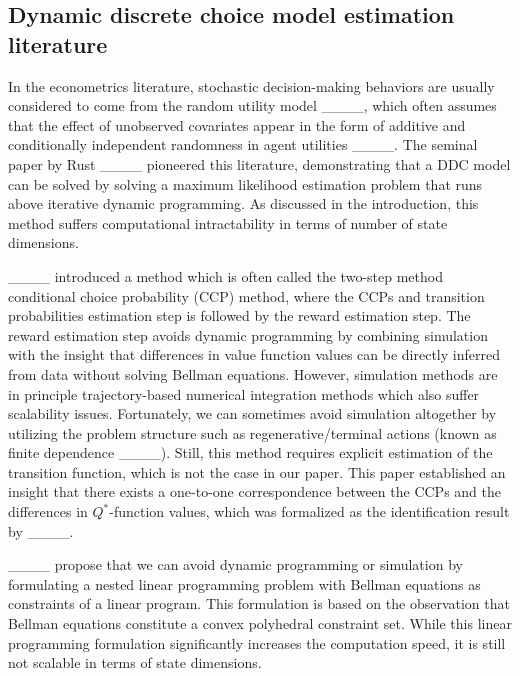 \subsection{Dynamic discrete choice model estimation literature}
In the econometrics literature, stochastic decision-making behaviors are usually considered to come from the random utility model ____, which often assumes that the effect of unobserved covariates appear in the form of additive and conditionally independent randomness in agent utilities ____.  
The seminal paper by Rust ____ pioneered this literature, demonstrating that a DDC model can be solved by solving a maximum likelihood estimation problem that runs above iterative dynamic programming. As discussed in the introduction, this method suffers computational intractability in terms of number of state dimensions.

____ introduced a method which is often called the two-step method conditional choice probability (CCP) method, where the CCPs and transition probabilities estimation step is followed by the reward estimation step. The reward estimation step avoids dynamic programming by combining simulation with the insight that differences in value function values can be directly inferred from data without solving Bellman equations. However, simulation methods are in principle trajectory-based numerical integration methods which also suffer scalability issues. Fortunately, we can sometimes avoid simulation altogether by utilizing the problem structure such as regenerative/terminal actions (known as finite dependence ____). Still, this method requires explicit estimation of the transition function, which is not the case in our paper. This paper established an insight that there exists a one-to-one correspondence between the CCPs and the differences in $Q^*$-function values, which was formalized as the identification result by ____. 

____ propose that we can avoid dynamic programming or simulation by formulating a nested linear programming problem with Bellman equations as constraints of a linear program. This formulation is based on the observation that Bellman equations constitute a convex polyhedral constraint set. While this linear programming formulation significantly increases the computation speed, it is still not scalable in terms of state dimensions.

